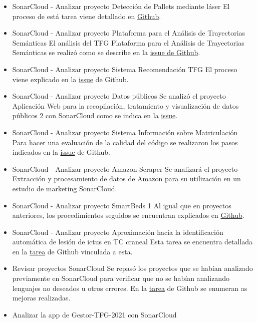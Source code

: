 \begin{itemize}
	\item SonarCloud - Analizar proyecto Detección de Pallets mediante láser
		El proceso de está tarea viene detallado en \href{https://github.com/dbo1001/Gestor-TFG-2021/issues/158}{Github}.
	\item SonarCloud - Analizar proyecto Plataforma para el Análisis de Trayectorias Semánticas
		El análisis del TFG Plataforma para el Análisis de Trayectorias Semánticas se realizó como se describe en la \href{https://github.com/dbo1001/Gestor-TFG-2021/issues/157}{issue de Github}.
	\item SonarCloud - Analizar proyecto Sistema Recomendación TFG
		El proceso viene explicado en la \href{https://github.com/dbo1001/Gestor-TFG-2021/issues/156}{issue} de Github.
	\item SonarCloud - Analizar proyecto Datos públicos
		Se analizó el proyecto Aplicación Web para la recopilación, tratamiento y visualización de datos públicos 2 con SonarCloud como se indica en la \href{https://github.com/dbo1001/Gestor-TFG-2021/issues/155}{issue}.
	\item SonarCloud - Analizar proyecto Sistema Información sobre Matriculación
		Para hacer una evaluación de la calidad del código se realizaron los pasos indicados en la \href{https://github.com/dbo1001/Gestor-TFG-2021/issues/152}{issue} de Github.
	\item SonarCloud - Analizar proyecto Amazon-Scraper
		Se analizará el proyecto Extracción y procesamiento de datos de Amazon para su utilización en un estudio de marketing SonarCloud. \href{https://github.com/dbo1001/Gestor-TFG-2021/issues/151}{}
	\item SonarCloud - Analizar proyecto SmartBeds 1
		Al igual que en proyectos anteriores, los procedimientos seguidos se encuentran explicados en \href{https://github.com/dbo1001/Gestor-TFG-2021/issues/149}{Github}.
	\item SonarCloud - Analizar proyecto Aproximación hacia la identificación automática de lesión de ictus en TC craneal
		Esta tarea se encuentra detallada en la \href{https://github.com/dbo1001/Gestor-TFG-2021/issues/146}{tarea} de Github vinculada a esta.
	\item Revisar proyectos SonarCloud
		Se repasó los proyectos que se habían analizado previamente en SonarCloud para verificar que no se habían analizando lenguajes no deseados u otros errores. En la \href{https://github.com/dbo1001/Gestor-TFG-2021/issues/123}{tarea} de Github se enumeran as mejoras realizadas.
	\item Analizar la app de Gestor-TFG-2021 con SonarCloud

\end{itemize}
